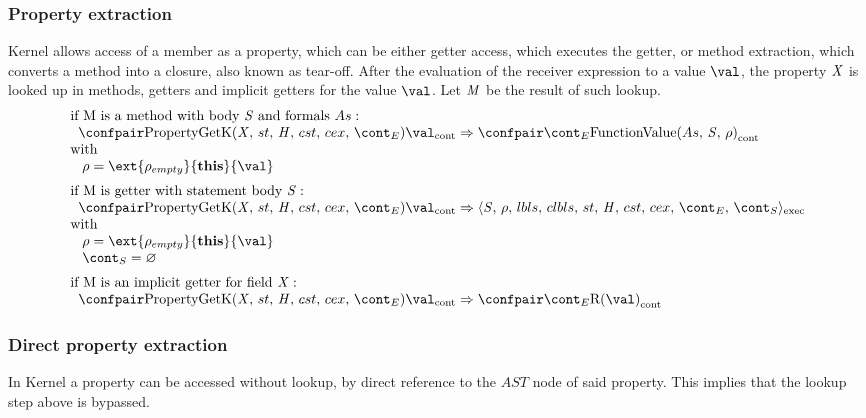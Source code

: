 \documentclass{article}
\renewcommand{\emptyset}{\varnothing}
\newcommand{\cesktrans}[2]{\ensuremath{{#1} \Rightarrow {#2}}}
\begin{document}
\subsubsection{Property extraction}
\label{subsubsec:property-extraction}
Kernel allows access of a member as a property, which can be either getter access, which executes the getter, or method extraction, which converts a method into a closure, also known as tear-off.
\noindent
After the evaluation of the receiver expression to a value $\val$, the property $\mathit{X}$ is looked up in methods, getters and implicit getters for the value $\val$.
Let $\mathit{M}$ be the result of such lookup.
\[
  \begin{array}{lcl@{\hspace{30mm}}}
	\textrm{if M is a method with body }\stmt\textrm{ and formals }\formals :\\
	\hspace{2mm}
	\cesktrans{
		\contconf{\PropertyGetK}{\val}}{
		\contconf{\econt}{\funval{\formals}{\stmt}{\env}}}\\
	\textrm{with}\\
	\hspace{3mm}
	\env = \ext{\env_{empty}}{\mathbf{this}}{\val}\\[2mm]

	\textrm{if M is getter with statement body }\stmt :\\
	\hspace{2mm}
	\cesktrans{
		\contconf{\PropertyGetK}{\val}}{
		\execconf{\stmt}{\env}{\lbls}{\clbls}{\handler}{\cstrace}{\cex}{\econt}{\scont}
		}\\
	\textrm{with}\\
	\hspace{3mm}
	\env = \ext{\env_{empty}}{\mathbf{this}}{\val}\\
	\hspace{3mm}
	\scont = \emptyset\\[2mm]

	\textrm{if M is an implicit getter for field }\idmeta :\\
	\hspace{2mm}
	\cesktrans{
		\contconf{\PropertyGetK}{\val}}{
		\contconf{\econt}{\textrm{R}(\val)}}
  \end{array}
\]

\subsubsection{Direct property extraction}
\label{subsubsec:direct-property-extraction}
In Kernel a property can be accessed without lookup, by direct reference to the $AST$ node of said property.
This implies that the lookup step above is bypassed.
\end{document}
